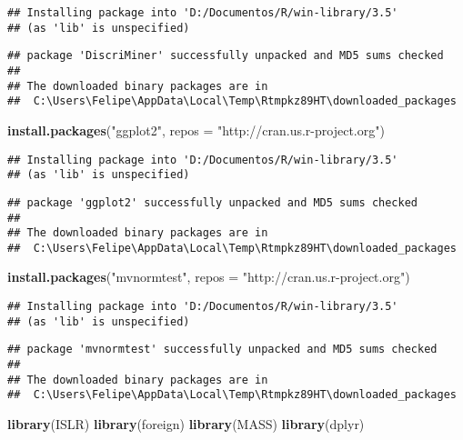 \documentclass[]{article}
\newenvironment{Shaded}{\begin{snugshade}}{\end{snugshade}}
\newcommand{\KeywordTok}[1]{\textcolor[rgb]{0.13,0.29,0.53}{\textbf{#1}}}
\newcommand{\DataTypeTok}[1]{\textcolor[rgb]{0.13,0.29,0.53}{#1}}
\newcommand{\StringTok}[1]{\textcolor[rgb]{0.31,0.60,0.02}{#1}}
\newcommand{\NormalTok}[1]{#1}
\begin{document}
\begin{verbatim}
## Installing package into 'D:/Documentos/R/win-library/3.5'
## (as 'lib' is unspecified)
\end{verbatim}

\begin{verbatim}
## package 'DiscriMiner' successfully unpacked and MD5 sums checked
## 
## The downloaded binary packages are in
##  C:\Users\Felipe\AppData\Local\Temp\Rtmpkz89HT\downloaded_packages
\end{verbatim}

\begin{Shaded}
\begin{Highlighting}[]
\KeywordTok{install.packages}\NormalTok{(}\StringTok{"ggplot2"}\NormalTok{, }\DataTypeTok{repos =} \StringTok{"http://cran.us.r-project.org"}\NormalTok{)}
\end{Highlighting}
\end{Shaded}

\begin{verbatim}
## Installing package into 'D:/Documentos/R/win-library/3.5'
## (as 'lib' is unspecified)
\end{verbatim}

\begin{verbatim}
## package 'ggplot2' successfully unpacked and MD5 sums checked
## 
## The downloaded binary packages are in
##  C:\Users\Felipe\AppData\Local\Temp\Rtmpkz89HT\downloaded_packages
\end{verbatim}

\begin{Shaded}
\begin{Highlighting}[]
\KeywordTok{install.packages}\NormalTok{(}\StringTok{"mvnormtest"}\NormalTok{, }\DataTypeTok{repos =} \StringTok{"http://cran.us.r-project.org"}\NormalTok{)}
\end{Highlighting}
\end{Shaded}

\begin{verbatim}
## Installing package into 'D:/Documentos/R/win-library/3.5'
## (as 'lib' is unspecified)
\end{verbatim}

\begin{verbatim}
## package 'mvnormtest' successfully unpacked and MD5 sums checked
## 
## The downloaded binary packages are in
##  C:\Users\Felipe\AppData\Local\Temp\Rtmpkz89HT\downloaded_packages
\end{verbatim}

\begin{Shaded}
\begin{Highlighting}[]
\KeywordTok{library}\NormalTok{(ISLR)}
\KeywordTok{library}\NormalTok{(foreign)}
\KeywordTok{library}\NormalTok{(MASS)}
\KeywordTok{library}\NormalTok{(dplyr)}
\end{Highlighting}
\end{Shaded}
\end{document}

